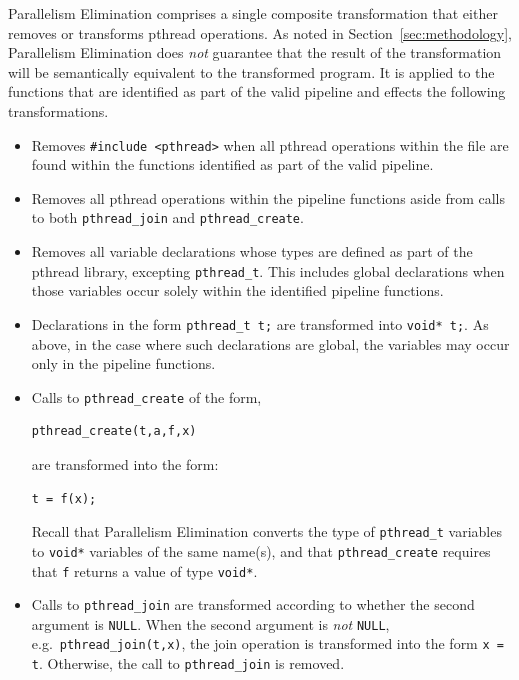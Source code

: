 Parallelism Elimination comprises a single composite transformation that either removes or transforms pthread operations. As noted in Section~\ref{sec:methodology}, Parallelism Elimination
does \emph{not} guarantee that the result of the transformation will be semantically equivalent to the transformed program. It is applied to the functions that are identified as part of the valid pipeline and effects the following transformations.
%
\begin{itemize}
\item Removes \lstinline|#include <pthread>| when all pthread operations within the file are found within the functions identified as part of the valid pipeline.
\item Removes all pthread operations within the pipeline functions aside from calls to both \lstinline|pthread_join| and \lstinline|pthread_create|.
\item Removes all variable declarations whose types are defined as part of the pthread library, excepting \lstinline|pthread_t|. This includes global declarations when those variables occur solely within the identified pipeline functions.
\item Declarations in the form \lstinline|pthread_t t;| are transformed into \lstinline|void* t;|. As above, in the case where such declarations are global, the variables may occur only in the pipeline functions.
\item Calls to \lstinline|pthread_create| of the form,
%
\begin{lstlisting}
pthread_create(t,a,f,x)
\end{lstlisting}
%
are transformed into the form:
%
\begin{lstlisting}
t = f(x);
\end{lstlisting}
%
\noindent
Recall that Parallelism Elimination converts the type of \lstinline|pthread_t| variables to \lstinline|void*| variables of the same name(s), and that \lstinline|pthread_create| requires that \lstinline|f| returns a value of type \lstinline|void*|.
%
\item Calls to \lstinline|pthread_join| are transformed according to whether the second argument is \lstinline|NULL|. When the second argument is \emph{not} \lstinline|NULL|, e.g.\ \lstinline|pthread_join(t,x)|, the join operation is transformed into the form \lstinline|x = t|. Otherwise, the call to \lstinline|pthread_join| is removed.

\end{itemize}
